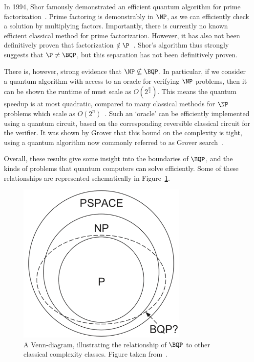 In 1994, Shor famously demonstrated an efficient quantum algorithm for prime factorization~\cite{Shor1994}. Prime factoring is demonstrably in $\NP$, as we can efficiently check a solution by multiplying factors. Importantly, there is currently no known efficient classical method for prime factorization. However, it has also not been definitively proven that factorization $\notin \P$~\cite{Nielsen2000}. Shor's algorithm thus strongly suggests that $\P\neq \BQP$, but this separation has not been definitively proven.\par
There is, however, strong evidence that $\NP\nsubseteq \BQP$. In particular, if we consider a quantum algorithm with access to an oracle for verifying $\NP$ problems, then it can be shown the runtime of must scale as $O\left(2^{\frac{n}{2}}\right)$. This means the quantum speedup is at most quadratic, compared to many classical methods for $\NP$ problems which scale as $O\left(2^{n}\right)$~\cite{Bennett1997}. Such an `oracle' can be efficiently implemented using a quantum circuit, based on the corresponding reversible classical circuit for the verifier. It was shown by Grover that this bound on the complexity is tight, using a quantum algorithm now commonly referred to as Grover search~\cite{Grover1996}.
\par
Overall, these results give some insight into the boundaries of $\BQP$, and the kinds of problems that quantum computers can solve efficiently. Some of these relationships are represented schematically in Figure~\ref{fig:bqp_venn}.
\begin{figure}
\centering
\includegraphics[width=0.75\textwidth]{Figures/BQP_diagram.png}
\caption{A Venn-diagram, illustrating the relationship of $\BQP$ to other classical complexity classes. Figure taken from~\cite{Nielsen2000}.}\label{fig:bqp_venn}
\end{figure}
